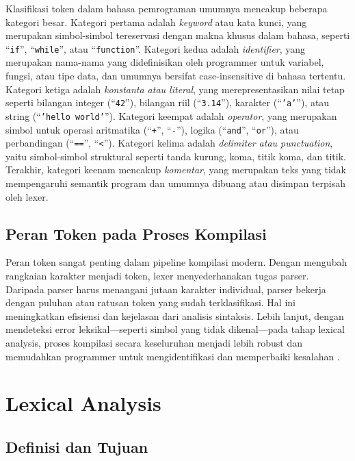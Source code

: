 Klasifikasi token dalam bahasa pemrograman umumnya mencakup beberapa kategori besar. Kategori pertama adalah \textit{keyword} atau kata kunci, yang merupakan simbol-simbol tereservasi dengan makna khusus dalam bahasa, seperti ``\texttt{if}'', ``\texttt{while}'', atau ``\texttt{function}''. Kategori kedua adalah \textit{identifier}, yang merupakan nama-nama yang didefinisikan oleh programmer untuk variabel, fungsi, atau tipe data, dan umumnya bersifat case-insensitive di bahasa tertentu. Kategori ketiga adalah \textit{konstanta atau literal}, yang merepresentasikan nilai tetap seperti bilangan integer (``\texttt{42}''), bilangan riil (``\texttt{3.14}''), karakter (``\texttt{'a'}''), atau string (``\texttt{'hello world'}''). Kategori keempat adalah \textit{operator}, yang merupakan simbol untuk operasi aritmatika (``\texttt{+}'', ``\texttt{-}''), logika (``\texttt{and}'', ``\texttt{or}''), atau perbandingan (``\texttt{==}'', ``\texttt{<}''). Kategori kelima adalah \textit{delimiter atau punctuation}, yaitu simbol-simbol struktural seperti tanda kurung, koma, titik koma, dan titik. Terakhir, kategori keenam mencakup \textit{komentar}, yang merupakan teks yang tidak mempengaruhi semantik program dan umumnya dibuang atau disimpan terpisah oleh lexer.

\subsection{Peran Token pada Proses Kompilasi}

Peran token sangat penting dalam pipeline kompilasi modern. Dengan mengubah rangkaian karakter menjadi token, lexer menyederhanakan tugas parser. Daripada parser harus menangani jutaan karakter individual, parser bekerja dengan puluhan atau ratusan token yang sudah terklasifikasi. Hal ini meningkatkan efisiensi dan kejelasan dari analisis sintaksis. Lebih lanjut, dengan mendeteksi error leksikal—seperti simbol yang tidak dikenal—pada tahap lexical analysis, proses kompilasi secara keseluruhan menjadi lebih robust dan memudahkan programmer untuk mengidentifikasi dan memperbaiki kesalahan \cite{aho2007compilers,hopcroft2006automata}.

\section{Lexical Analysis}

\subsection{Definisi dan Tujuan}

